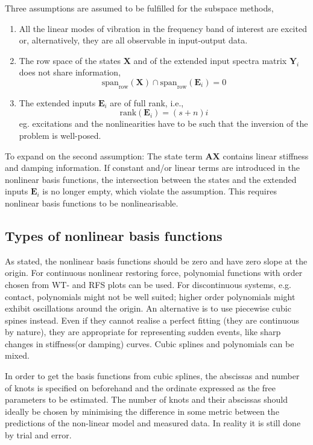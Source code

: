 Three assumptions are assumed to be fulfilled for the subspace methods,
\begin{enumerate}
\item All the linear modes of vibration in the frequency band of interest are
  excited or, alternatively, they are all observable in input-output data.
\item The row space of the states $\bm X$ and of the extended input spectra
  matrix $\bm Y_i$ does not share information,
  \begin{equation*}
    \text{span}_{\text{row}} (\bm X) \cap \text{span}_{\text{row}}(\bm E_i) = 0
  \end{equation*}
\item The extended inputs $\bm E_i$ are of full rank, i.e.,
  \begin{equation*}
    \text{rank}(\bm E_i) = (s+n) i
  \end{equation*}
  eg. excitations and the nonlinearities have to be such that the inversion of the
  problem is well-posed.
\end{enumerate}

To expand on the second assumption:
The state term $\bm A \bm X$ contains linear stiffness and damping information.
If constant and/or linear terms are introduced in the nonlinear basis functions,
the intersection between the states and the extended inputs $\bm E_i$ is no
longer empty, which violate the assumption.
This requires nonlinear basis functions to be nonlinearisable.

\FloatBarrier


\subsection{Types of nonlinear basis functions}
\label{sec:fnsi_functional}


As stated, the nonlinear basis functions should be zero and have zero slope at
the origin. For continuous nonlinear restoring force, polynomial functions with
order chosen from WT- and RFS plots can be used. For discontinuous systems, e.g.
contact, polynomials might not be well suited; higher order polynomials might
exhibit oscillations around the origin. An alternative is to use piecewise cubic
spines instead. Even if they cannot realise a perfect fitting (they are
continuous by nature), they are appropriate for representing sudden events, like
sharp changes in stiffness(or damping) curves. Cubic splines and polynomials can
be mixed.

In order to get the basis functions from cubic splines, the abscissas and number
of knots is specified on beforehand and the ordinate expressed as the free
parameters to be estimated. The number of knots and their abscissas should
ideally be chosen by minimising the difference in some metric between the
predictions of the non-linear model and measured data. In reality it is still
done by trial and error.

